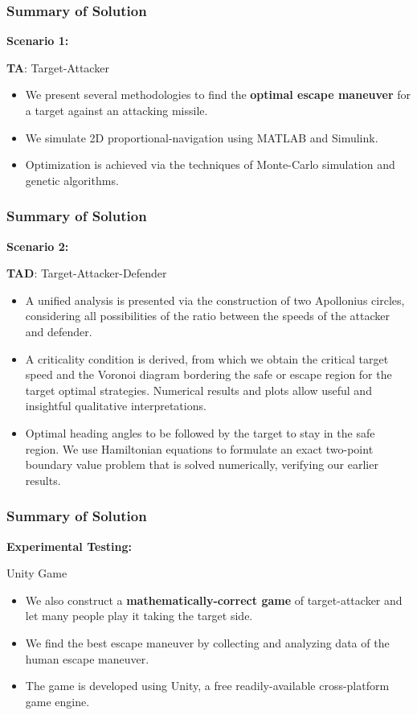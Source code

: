 \documentclass{beamer}
\begin{document}
\begin{frame}
\frametitle{Summary of Solution}
\textbf{Scenario 1:}
\begin{block}{\textbf{TA}: Target-Attacker}
	\begin{itemize}
		\item We present several methodologies to find the \textbf{optimal escape maneuver} for a target against an attacking missile. 
		\item We simulate 2D proportional-navigation using MATLAB and Simulink.
		\item Optimization is achieved via the techniques of Monte-Carlo simulation and genetic algorithms.
	\end{itemize}
\end{block}
\end{frame}
\begin{frame}
\frametitle{Summary of Solution}
\textbf{Scenario 2:}
\begin{exampleblock}{\textbf{TAD}: Target-Attacker-Defender}
	\begin{itemize}
		\item A unified analysis is presented via the construction of two Apollonius circles, considering all possibilities of the ratio between the speeds of the attacker and defender. 
		\item A criticality condition is derived, from which we obtain the critical target speed and the Voronoi diagram bordering the safe or escape region for the target optimal strategies. Numerical results and plots allow useful and insightful qualitative interpretations. 
		\item Optimal heading angles to be followed by the target to stay in the safe region. We use Hamiltonian equations to formulate an exact two-point boundary value problem that is solved numerically, verifying our earlier results.
	\end{itemize}
\end{exampleblock}
\end{frame}
\begin{frame}
\frametitle{Summary of Solution}
\textbf{Experimental Testing:}
\begin{alertblock}{Unity Game}
	\begin{itemize}
		\item We also construct a \textbf{mathematically-correct game} of target-attacker and let many people play it taking the target side. 
		\item We find the best escape maneuver by collecting and analyzing data of the human escape maneuver. 
		\item The game is developed using Unity, a free readily-available cross-platform game engine.
	\end{itemize}
\end{alertblock}
\end{frame}
\end{document}
